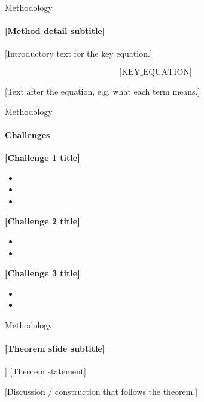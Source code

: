 \documentclass[t,pdf,aspectratio=169]{beamer}
\newcommand{\ph}[1]{[#1]}
\begin{document}
\begin{frame}{Methodology}
  \framesubtitle{\ph{Method detail subtitle}}
  \vfill

  \ph{Introductory text for the key equation.}

  \begin{equation}
    \text{\ph{KEY\_EQUATION}}   %
  \end{equation}

  \ph{Text after the equation, e.g. what each term means.}

  \vfill
\end{frame}

\begin{frame}{Methodology}
  \framesubtitle{Challenges}
  \vfill

  \textbf{\textcolor{PRIMARY}{\ph{Challenge 1 title}}}
  \scriptsize
  \begin{itemize}
    \item[-] \ph{Challenge 1, item 1}
    \item[-] \ph{Challenge 1, item 2}
    \item[-] \ph{Challenge 1, item 3}
  \end{itemize}
  \medskip
  \normalsize

  \textbf{\textcolor{PRIMARY}{\ph{Challenge 2 title}}}
  \scriptsize
  \begin{itemize}
    \item[-] \ph{Challenge 2, item 1}
    \item[-] \ph{Challenge 2, item 2}
  \end{itemize}
  \medskip
  \normalsize

  \textbf{\textcolor{PRIMARY}{\ph{Challenge 3 title}}}
  \scriptsize
  \begin{itemize}
    \item[-] \ph{Challenge 3, item 1}
    \item[-] \ph{Challenge 3, item 2}
  \end{itemize}
  \vfill
\end{frame}

\begin{frame}{Methodology}
  \framesubtitle{\ph{Theorem slide subtitle}}
  \vfill
  \begin{theorem}[\ph{Theorem name}]
    \ph{Theorem statement}
  \end{theorem}
  \vfill
  \ph{Discussion / construction that follows the theorem.}
  \vfill
\end{frame}
\end{document}
